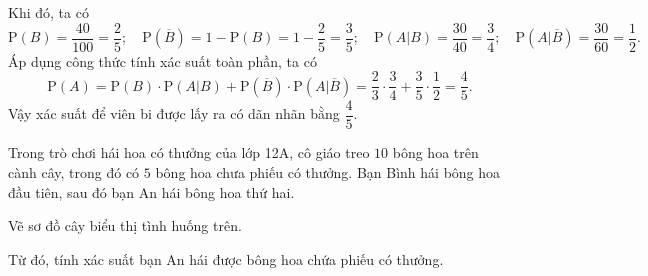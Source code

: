 \begin{vd}
{\begin{listEX}
\begin{itemize}
			\end{itemize}
			Khi đó, ta có
		$$\mathrm{P}(B)=\dfrac{40}{100} = \dfrac{2}{5};
		\quad \mathrm{P}\left(\overline{B}\right)= 1 - \mathrm{P}(B)=1-\dfrac{2}{5}=\dfrac{3}{5};
		\quad \mathrm{P}(A|B) = \dfrac{30}{40}=\dfrac{3}{4};
		\quad \mathrm{P}\left(A|\overline{B}\right)=\dfrac{30}{60}=\dfrac{1}{2}.$$
			Áp dụng công thức tính xác suất toàn phần, ta có
			\[\mathrm{P}(A) = \mathrm{P}(B)\cdot\mathrm{P}\left(A|B\right) + \mathrm{P}\left(\overline{B}\right)\cdot\mathrm{P}\left(A|\overline{B}\right) = \dfrac{2}{3}\cdot \dfrac{3}{4} + \dfrac{3}{5}\cdot \dfrac{1}{2}=\dfrac{4}{5}.\]
			Vậy xác suất để viên bi được lấy ra có dãn nhãn bằng $\dfrac{4}{5}$.
		\end{listEX}
	}
\end{vd}
\begin{vd}%
	Trong trò chơi hái hoa có thưởng của lớp 12A, cô giáo treo $10$ bông hoa trên cành cây, trong đó có $5$ bông hoa chưa phiếu có thưởng. Bạn Bình hái bông hoa đầu tiên, sau đó bạn An hái bông hoa thứ hai.
	\begin{listEX}
		\item Vẽ sơ đồ cây biểu thị tình huống trên.
		\item Từ đó, tính xác suất bạn An hái được bông hoa chứa phiếu có thưởng.
	\end{listEX}
\end{vd}
